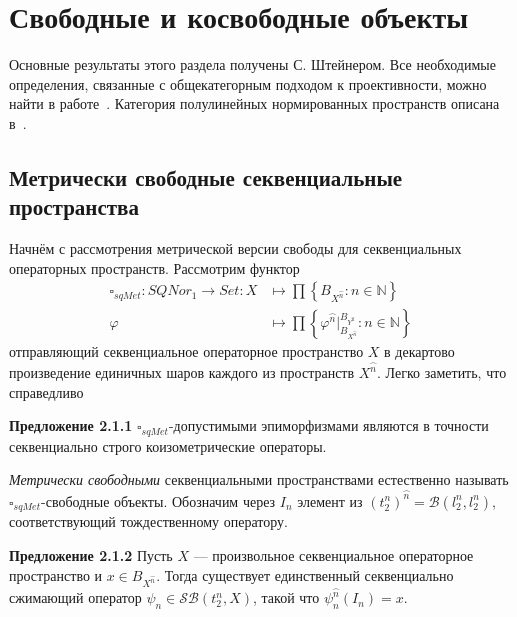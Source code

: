 \documentclass[12pt]{article}
\begin{document}
\section{Свободные и косвободные объекты}

Основные результаты этого раздела получены С. Штейнером. Все необходимые
определения, связанные с общекатегорным подходом к проективности, можно найти в
работе~\cite{HelMetrFrQmod}. Категория полулинейных нормированных пространств
описана в~\cite{ShteinerTopFr}.

\subsection{Метрически свободные секвенциальные пространства}

Начнём с рассмотрения метрической версии свободы для секвенциальных операторных
пространств. Рассмотрим функтор 
$$
\begin{aligned}
\square_{sqMet} 
: SQNor_1 \to Set 
: X&\mapsto\prod\left \{ B_{X^{\wideparen{n}}}:n \in \mathbb{N}\right \} \\
\varphi&\mapsto \prod\left \{
    \varphi^{\wideparen{n}}|_{
        B_{X^{\wideparen{n}}}
    }^{B_{
        Y^{\wideparen{n}}}
    }
    :n\in\mathbb{N}
\right \}
\end{aligned}
$$
отправляющий  секвенциальное операторное пространство $X$ в декартово
произведение единичных шаров каждого из пространств $X^{\wideparen{n}}$. Легко
заметить, что справедливо

{\bf Предложение 2.1.1} $\square_{sqMet}$-допустимыми эпиморфизмами являются в
точности секвенциально строго коизометрические операторы.

\medskip


\textit{Метрически свободными} секвенциальными пространствами естественно
называть $\square_{sqMet}$-свободные объекты. Обозначим через $I_n$ элемент из
${(t_2^n)}^{\wideparen{n}} = \mathcal{B}(l_2^n, l_2^n)$, соответствующий
тождественному оператору.

\medskip

{\bf Предложение 2.1.2}\label{PrMetrFrLem} Пусть $X$ --- произвольное
секвенциальное операторное пространство и $x \in B_{X^{\wideparen{n}}}$. Тогда
существует единственный секвенциально сжимающий оператор 
$\psi_n \in \mathcal{SB}(t_2^n, X)$, такой что 
$\psi_n^{\wideparen{n}}(I_n) = x$.
\end{document}

